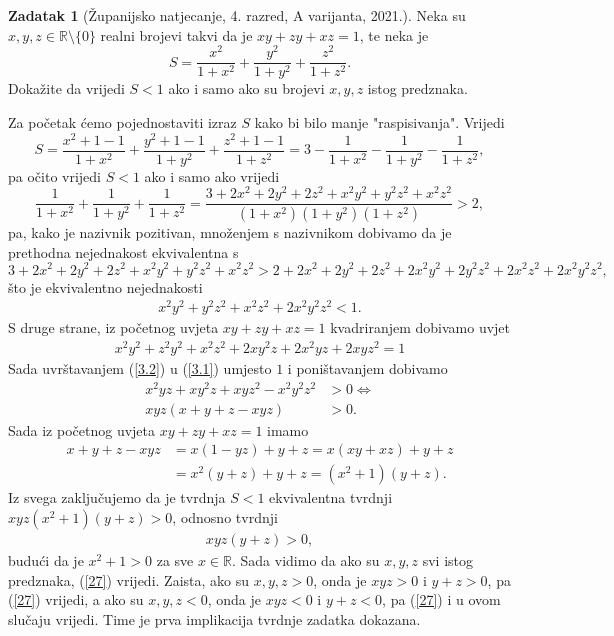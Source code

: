 \documentclass{book}
\renewenvironment{proof}{%
    \vspace{-\parskip}\begin{oldproof}%
    }{%
    \end{oldproof}%
}
\theoremstyle{definition}
\theoremstyle{definition}
\newtheorem{exercise}{Zadatak}
\theoremstyle{remark}
\begin{document}
\begin{exercise}[Županijsko natjecanje, 4. razred, A varijanta, 2021.]
Neka su $x, y, z\in \mathbb{R}\setminus\{0\}$ realni brojevi takvi da je $xy+zy+xz=1$, te neka je
$$S=\dfrac{x^2}{1+x^2}+\dfrac{y^2}{1+y^2}+\dfrac{z^2}{1+z^2}.$$
Dokažite da vrijedi $S<1$ ako i samo ako su brojevi $x, y, z$ istog predznaka.
\end{exercise}
\begin{proof}[Rješenje]
Za početak ćemo pojednostaviti izraz $S$ kako bi bilo manje "raspisivanja". Vrijedi
$$S=\dfrac{x^2+1-1}{1+x^2}+\dfrac{y^2+1-1}{1+y^2}+\dfrac{z^2+1-1}{1+z^2}=3-\dfrac{1}{1+x^2}-\dfrac{1}{1+y^2}-\dfrac{1}{1+z^2},$$
pa očito vrijedi $S<1$ ako i samo ako vrijedi
$$\dfrac{1}{1+x^2}+\dfrac{1}{1+y^2}+\dfrac{1}{1+z^2}=\dfrac{3+2x^2+2y^2+2z^2+x^2y^2+y^2z^2+x^2z^2}{(1+x^2)(1+y^2)(1+z^2)}>2,$$
pa, kako je nazivnik pozitivan, množenjem s nazivnikom dobivamo da je prethodna nejednakost ekvivalentna s
$$3+2x^2+2y^2+2z^2+x^2y^2+y^2z^2+x^2z^2>2+2x^2+2y^2+2z^2+2x^2y^2+2y^2z^2+2x^2z^2+2x^2y^2z^2,$$
što je ekvivalentno nejednakosti
\begin{gather}
\label{3.1}
x^2y^2+y^2z^2+x^2z^2+2x^2y^2z^2<1.
\end{gather}
S druge strane, iz početnog uvjeta $xy+zy+xz=1$ kvadriranjem dobivamo uvjet
\begin{gather}
\label{3.2}
x^2y^2+z^2y^2+x^2z^2+2xy^2z+2x^2yz+2xyz^2=1
\end{gather}
Sada uvrštavanjem (\ref{3.2}) u (\ref{3.1}) umjesto $1$ i poništavanjem dobivamo
\begin{align*}
x^2yz+xy^2z+xyz^2-x^2y^2z^2&>0 \Leftrightarrow\\
xyz(x+y+z-xyz)&>0.
\end{align*}
Sada iz početnog uvjeta $xy+zy+xz=1$ imamo 
\begin{align*}
x+y+z-xyz&=x(1-yz)+y+z=x(xy+xz)+y+z\\
&=x^2(y+z)+y+z=(x^2+1)(y+z).
\end{align*}
Iz svega zaključujemo da je tvrdnja $S<1$ ekvivalentna tvrdnji $xyz(x^2+1)(y+z)>0$, odnosno tvrdnji 
\begin{align}
\label{27}
xyz(y+z)>0,
\end{align}
budući da je $x^2+1>0$ za sve $x\in \mathbb{R}$. Sada vidimo da ako su $x, y, z$ svi istog predznaka, (\ref{27}) vrijedi. Zaista, ako su $x, y, z>0$, onda je $xyz>0$ i $y+z>0$, pa (\ref{27}) vrijedi, a ako su $x, y, z<0$, onda je $xyz<0$ i $y+z<0$, pa (\ref{27}) i u ovom slučaju vrijedi. Time je prva implikacija tvrdnje zadatka dokazana. 


\end{proof}
\end{document}
